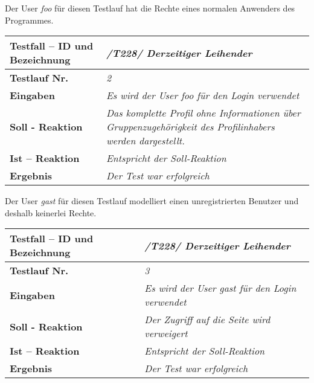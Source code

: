 Der User \emph{foo} für diesen Testlauf hat die Rechte eines normalen Anwenders
des Programmes. 

\begin{longtable}{|p{5cm}|p{10cm}|}
\hline
\textbf{Testfall -- ID und Bezeichnung} & \textit{/T228/ Derzeitiger
Leihender} \\
\hline
\textbf{Testlauf Nr.} & \textit{2} \\
\hline
\textbf{Eingaben} & \textit{Es wird der User \emph{foo} für den Login verwendet} \\
\hline
\textbf{Soll - Reaktion} & \textit{Das komplette Profil ohne Informationen über
Gruppenzugehörigkeit des Profilinhabers werden dargestellt.
} \\
\hline
\textbf{Ist -- Reaktion} & \textit{Entspricht der Soll-Reaktion} \\
\hline
\textbf{Ergebnis} & \textit{Der Test war erfolgreich} \\
\hline
 \end{longtable}

Der User \emph{gast} für diesen Testlauf modelliert einen unregistrierten
Benutzer und deshalb keinerlei Rechte. 

\begin{longtable}{|p{5cm}|p{10cm}|}
\hline
\textbf{Testfall -- ID und Bezeichnung} & \textit{/T228/ Derzeitiger
Leihender} \\
\hline
\textbf{Testlauf Nr.} & \textit{3} \\
\hline
\textbf{Eingaben} & \textit{Es wird der User \emph{gast} für den Login verwendet} \\
\hline
\textbf{Soll - Reaktion} & \textit{Der Zugriff auf die Seite wird verweigert
} \\
\hline
\textbf{Ist -- Reaktion} & \textit{Entspricht der Soll-Reaktion} \\
\hline
\textbf{Ergebnis} & \textit{Der Test war erfolgreich} \\
\hline
 \end{longtable}
